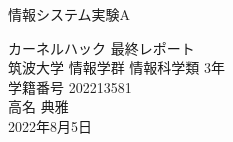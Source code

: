 \begin{titlepage}

\begin{flushright}
{\large
情報システム実験A
}
\end{flushright}
\begin{center}
\vspace*{200truept}
{\Huge カーネルハック 最終レポート}\\
\vspace{300truept}
{\LARGE 筑波大学 情報学群 情報科学類 3年}\\
\vspace{10truept}
{\LARGE 学籍番号 202213581}\\
\vspace{40truept}
{\huge 高名 典雅}\\
\vspace{40truept}
{\huge 2022年8月5日}\\
\end{center}

\end{titlepage}
